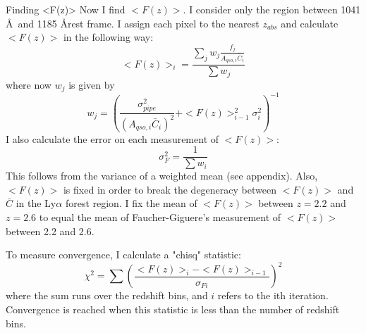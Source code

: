 \documentclass[12pt]{aastex}
\begin{document}
\begin{section}{Finding <F(z)>}
Now I find $<F(z)>$.  I consider only the region between
1041 \AA\ and 1185 \AA rest frame.  I assign each pixel
to the nearest $z_{abs}$ and calculate $<F(z)>$ in the following way:
\begin{equation}
<F(z)>_i = \frac{\sum_j w_j \frac{f_j}{A_{qso,i} \bar{C}_i}}{\sum w_j}
\label{eqn:fz}
\end{equation}
where now $w_j$ is given by
\begin{equation}
w_j = \left(\frac{\sigma_{pipe}^2}{(A_{qso,i} \bar{C}_i)^2} + <F(z)>_{i-1}^2\sigma_{i}^2\right)^{-1}
\label{eqn:w_for_fz}
\end{equation}
I also calculate the error on each measurement of $<F(z)>$:
\begin{equation}
\sigma^2_F = \frac{1}{\sum{w_i}}
\label{eqn:fz_error}
\end{equation}
This follows from the variance of a weighted mean (see appendix).  Also, $<F(z)>$ is fixed in order to break the degeneracy
between $<F(z)>$ and $\bar{C}$ in the Ly$\alpha$ forest region.  I fix the mean of $<F(z)>$ between $z = 2.2$ and $z = 2.6$
to equal the mean of Faucher-Giguere's measurement of $<F(z)>$ between 2.2 and 2.6.

To measure convergence, I calculate a "chisq" statistic:
\begin{equation}
\chi^2 = \sum \left(\frac{<F(z)>_{i}-<F(z)>_{i-1}}{\sigma_{Fi}}\right)^2
\label{eqn:fz_chisq}
\end{equation}
where the sum runs over the redshift bins, and $i$ refers to the ith iteration.  Convergence is reached when this statistic
is less than the number of redshift bins.

\end{section}
\end{document}
